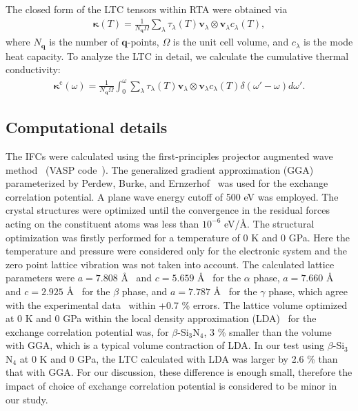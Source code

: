\documentclass[twocolumn,amsmath,amssymb,a4paper,prb,superscriptaddress,floatfix]{revtex4-1}
\begin{document}
The closed form of the LTC tensors within RTA were obtained via
\begin{align}
 \label{eq:kappa}
 \boldsymbol{\kappa}(T) = \frac{1}{N_\mathbf{q}\Omega} \sum_\lambda
 \tau_\lambda(T) \mathbf{v}_\lambda \otimes \mathbf{v}_\lambda c_\lambda(T),
\end{align}
where $N_\mathbf{q}$ is the number of
$\mathbf{q}$-points, $\Omega$ is the unit cell volume, and $c_\lambda$
is the mode heat capacity. To analyze the LTC in detail, we calculate
the cumulative thermal conductivity:
\begin{align}
 \label{eq:cum-kappa}
 \boldsymbol{\kappa}^\text{c}(\omega) = \frac{1}{N_\mathbf{q}\Omega}
 \int_0^\omega \sum_\lambda
 \tau_\lambda(T) \mathbf{v}_\lambda \otimes \mathbf{v}_\lambda
 c_\lambda(T) \delta(\omega'-\omega)d\omega'.
\end{align}

\subsection{Computational details}

The IFCs were calculated using the first-principles projector
augmented wave method~\cite{paw} (VASP code~\cite{vasp-1996,vasp-1995,
vasp-1999}). The generalized gradient approximation (GGA) parameterized by
Perdew, Burke, and Ernzerhof~\cite{pbe} was used for the exchange correlation
potential. A plane wave energy cutoff of 500 eV was employed. The crystal
structures were optimized until the convergence in the residual forces acting
on the constituent atoms was less than $10^{-6}$ eV/\AA. The structural
optimization was firstly performed for a temperature of 0 K and 0 GPa. Here the
temperature and pressure were considered only for the electronic system and the
zero point lattice vibration was not taken into account. The calculated lattice
parameters were $a=7.808$ \AA~ and $c=5.659$ \AA~ for the $\alpha$ phase,
$a=7.660$ \AA~ and $c=2.925$ \AA~ for the $\beta$ phase, and $a=7.787$ \AA~
for the $\gamma$ phase, which agree with the experimental
data~\cite{yashima,boulay,paszkowicz} within +0.7 \% errors. The lattice
volume optimized at 0 K and 0 GPa within the local density approximation
(LDA)~\cite{lda} for the exchange correlation potential was, for
$\beta$-Si$_3$N$_4$, 3 \% smaller than the volume with GGA, which is a typical
volume contraction of LDA. In our test using $\beta$-Si$_3$N$_4$ at 0 K and 0
GPa, the LTC calculated with LDA was larger by 2.6 \% than that with GGA. For
our discussion, these difference is enough small, therefore the impact of
choice of exchange correlation potential is considered to be minor in our
study.
\end{document}
